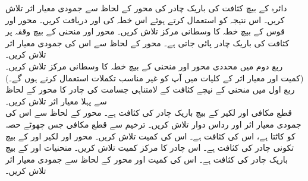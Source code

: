 دائرہ  کے بیچ کثافت   کی باریک چادر کی محور  کے لحاظ سے جمودی معیار اثر تلاش کریں۔ اس نتیجہ کو استعمال کرتے ہوئے اس خطہ کی  اور  دریافت کریں۔
محور  اور قوس  کے بیچ خطہ کا وسطانی مرکز تلاش کریں۔
محور  اور  منحنی  کے بیچ وقفہ  پر کثافت  کی باریک چادر پائی جاتی ہے۔ محور  کے لحاظ سے اس کی جمودی معیار اثر تلاش کریں۔
\\
ربع دوم میں محددی محور اور منحنی  کے بیچ خطہ کا وسطانی مرکز تلاش کریں۔ (کمیت اور معیار اثر کے کلیات میں آپ کو غیر مناسب تکملات استعمال کرنے ہوں گے۔)
\\
ربع اول میں منحنی  کے نیچے  کثافت  کے لامتناہی جسامت کی چادر   کا محور  کے لحاظ سے پہلا معیار اثر تلاش کریں۔
\\
قطع مکافی  اور لکیر  کے بیچ باریک چادر کی کثافت  ہے۔ محور  کے لحاظ سے اس کی جمودی معیار اثر اور رداس دوار تلاش کریں۔ 
ترخیم  سے قطع مکافی   جس چھوٹے حصہ کو کاٹتا ہے، اس کی کثافت  ہے۔ اس کی کمیت تلاش کریں۔
محور  اور  لکیر  اور  کے بیچ تکونی چادر کی کثافت  ہے۔ اس چادر کا مرکز کمیت تلاش کریں۔
منحنیات   اور  کے بیچ باریک چادر کی کثافت  ہے۔ اس کی کمیت اور محور  کے لحاظ سے جمودی معیار اثر تلاش کریں۔
